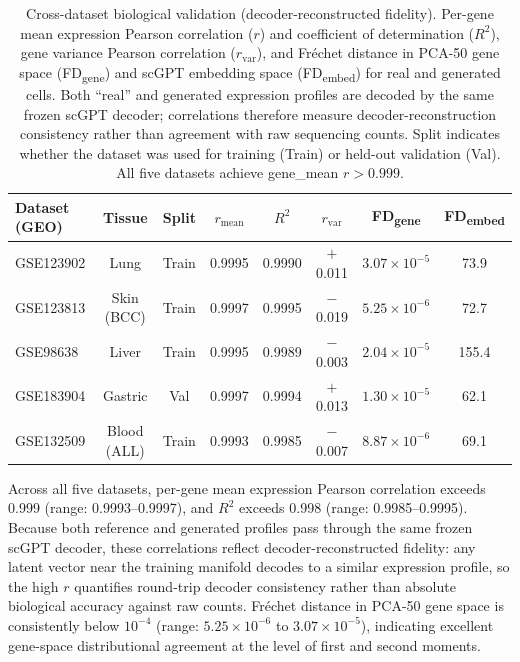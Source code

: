 \documentclass[biology,article,submit,pdftex,moreauthors]{Definitions/mdpi}
\begin{document}
\begin{table}[!htbp]
\caption{Cross-dataset biological validation (decoder-reconstructed fidelity). Per-gene mean expression Pearson correlation ($r$) and coefficient of determination ($R^2$), gene variance Pearson correlation ($r_\text{var}$), and Fr\'{e}chet distance in PCA-50 gene space (FD\textsubscript{gene}) and scGPT embedding space (FD\textsubscript{embed}) for real and generated cells. Both ``real'' and generated expression profiles are decoded by the same frozen scGPT decoder; correlations therefore measure decoder-reconstruction consistency rather than agreement with raw sequencing counts. Split indicates whether the dataset was used for training (Train) or held-out validation (Val). All five datasets achieve gene\_mean $r > 0.999$.\label{tab:cross-dataset}}
\centering
\small
\begin{tabular}{lccccccc}
\toprule
\textbf{Dataset (GEO)} & \textbf{Tissue} & \textbf{Split} & \textbf{$r_\text{mean}$} & \textbf{$R^2$} & \textbf{$r_\text{var}$} & \textbf{FD\textsubscript{gene}} & \textbf{FD\textsubscript{embed}} \\
\midrule
GSE123902 & Lung     & Train & 0.9995 & 0.9990 & $+$0.011  & $3.07 \times 10^{-5}$ & 73.9 \\
GSE123813 & Skin (BCC)  & Train & 0.9997 & 0.9995 & $-$0.019  & $5.25 \times 10^{-6}$ & 72.7 \\
GSE98638  & Liver    & Train & 0.9995 & 0.9989 & $-$0.003  & $2.04 \times 10^{-5}$ & 155.4 \\
GSE183904 & Gastric  & Val & 0.9997 & 0.9994 & $+$0.013  & $1.30 \times 10^{-5}$ & 62.1 \\
GSE132509 & Blood (ALL)  & Train & 0.9993 & 0.9985 & $-$0.007  & $8.87 \times 10^{-6}$ & 69.1 \\
\bottomrule
\end{tabular}
\end{table}

Across all five datasets, per-gene mean expression Pearson correlation exceeds 0.999 (range: 0.9993--0.9997), and $R^2$ exceeds 0.998 (range: 0.9985--0.9995). Because both reference and generated profiles pass through the same frozen scGPT decoder, these correlations reflect decoder-reconstructed fidelity: any latent vector near the training manifold decodes to a similar expression profile, so the high $r$ quantifies round-trip decoder consistency rather than absolute biological accuracy against raw counts. Fr\'{e}chet distance in PCA-50 gene space is consistently below $10^{-4}$ (range: $5.25 \times 10^{-6}$ to $3.07 \times 10^{-5}$), indicating excellent gene-space distributional agreement at the level of first and second moments.
\end{document}
